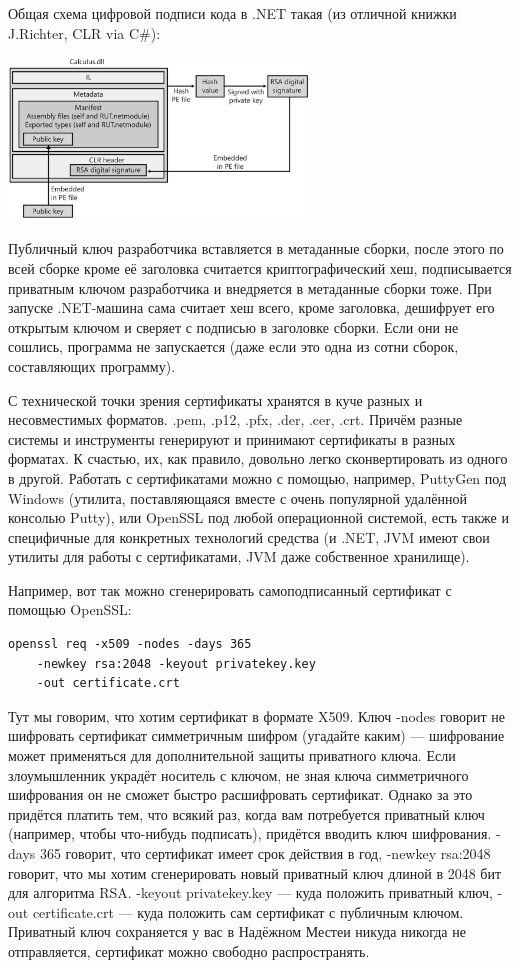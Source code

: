 \documentclass{../../text-style}
\begin{document}
Общая схема цифровой подписи кода в .NET такая (из отличной книжки J.Richter, CLR via C\#):

\begin{center}
    \includegraphics[width=0.6\textwidth]{dotNetCodeSigning.png}
\end{center}

Публичный ключ разработчика вставляется в метаданные сборки, после этого по всей сборке кроме её заголовка считается криптографический хеш, подписывается приватным ключом разработчика и внедряется в метаданные сборки тоже. При запуске .NET-машина сама считает хеш всего, кроме заголовка, дешифрует его открытым ключом и сверяет с подписью в заголовке сборки. Если они не сошлись, программа не запускается (даже если это одна из сотни сборок, составляющих программу).

С технической точки зрения сертификаты хранятся в куче разных и несовместимых форматов. .pem, .p12, .pfx, .der, .cer, .crt. Причём разные системы и инструменты генерируют и принимают сертификаты в разных форматах. К счастью, их, как правило, довольно легко сконвертировать из одного в другой. Работать с сертификатами можно с помощью, например, PuttyGen под Windows (утилита, поставляющаяся вместе с очень популярной удалённой консолью Putty), или OpenSSL под любой операционной системой, есть также и специфичные для конкретных технологий средства (и .NET, JVM имеют свои утилиты для работы с сертификатами, JVM даже собственное хранилище).

Например, вот так можно сгенерировать самоподписанный сертификат с помощью OpenSSL:

\begin{verbatim}
openssl req -x509 -nodes -days 365 
    -newkey rsa:2048 -keyout privatekey.key 
    -out certificate.crt
\end{verbatim}

Тут мы говорим, что хотим сертификат в формате X509. Ключ -nodes говорит не шифровать сертификат симметричным шифром (угадайте каким) --- шифрование может применяться для дополнительной защиты приватного ключа. Если злоумышленник украдёт носитель с ключом, не зная ключа симметричного шифрования он не сможет быстро расшифровать сертификат. Однако за это придётся платить тем, что всякий раз, когда вам потребуется приватный ключ (например, чтобы что-нибудь подписать), придётся вводить ключ шифрования. -days 365 говорит, что сертификат имеет срок действия в год, -newkey rsa:2048 говорит, что мы хотим сгенерировать новый приватный ключ длиной в 2048 бит для алгоритма RSA. -keyout privatekey.key --- куда положить приватный ключ, -out certificate.crt --- куда положить сам сертификат с публичным ключом. Приватный ключ сохраняется у вас в Надёжном Месте\texttrademark и никуда никогда не отправляется, сертификат можно свободно распространять.
\end{document}
